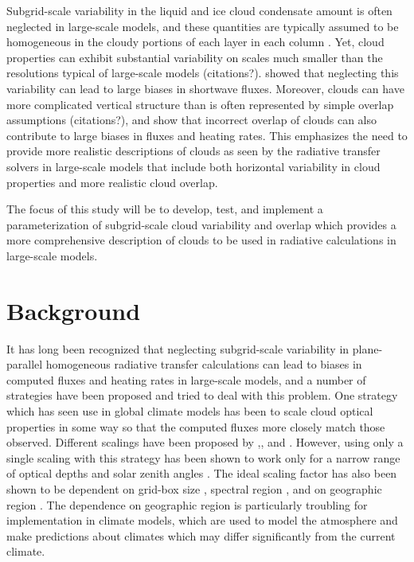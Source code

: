 \documentclass{article}
\begin{document}
Subgrid-scale variability in the liquid and ice cloud condensate amount is often neglected in large-scale models, and these quantities are typically assumed to be homogeneous in the cloudy portions of each layer in each column \citep[e.g.][]{cam3_description,cam4_description,cam5_description,am2_evaluation,donner_et_al_2011}. Yet, cloud properties can exhibit substantial variability on scales much smaller than the resolutions typical of large-scale models (citations?). \cite{barker_et_al_1999} showed that neglecting this variability can lead to large biases in shortwave fluxes. Moreover, clouds can have more complicated vertical structure than is often represented by simple overlap assumptions (citations?), and \cite{barker_et_al_1999} show that incorrect overlap of clouds can also contribute to large biases in fluxes and heating rates. This emphasizes the need to provide more realistic descriptions of clouds as seen by the radiative transfer solvers in large-scale models that include both horizontal variability in cloud properties and more realistic cloud overlap.

The focus of this study will be to develop, test, and implement a parameterization of subgrid-scale cloud variability and overlap which provides a more comprehensive description of clouds to be used in radiative calculations in large-scale models.

\section{Background}
It has long been recognized that neglecting subgrid-scale variability in plane-parallel homogeneous radiative transfer calculations can lead to biases in computed fluxes and heating rates in large-scale models, and a number of strategies have been proposed and tried to deal with this problem. One strategy which has seen use in global climate models \citep[e.g.][]{am2_evaluation} has been to scale cloud optical properties in some way so that the computed fluxes more closely match those observed. Different scalings have been proposed by \cite{davis_et_al_1990},\cite{cahalan_et_al_1994}, and \cite{cairns_et_al_2000}. However, using only a single scaling with this strategy has been shown to work only for a narrow range of optical depths and solar zenith angles \citep{cahalan_et_al_1994,barker_1996}. The ideal scaling factor has also been shown to be dependent on grid-box size \citep{pomroy_and_illingworth_2000}, spectral region \citep{yu_et_al_1997}, and on geographic region \citep{oreopoulos_and_cahalan_2005}. The dependence on geographic region is particularly troubling for implementation in climate models, which are used to model the atmosphere and make predictions about climates which may differ significantly from the current climate.
\end{document}

